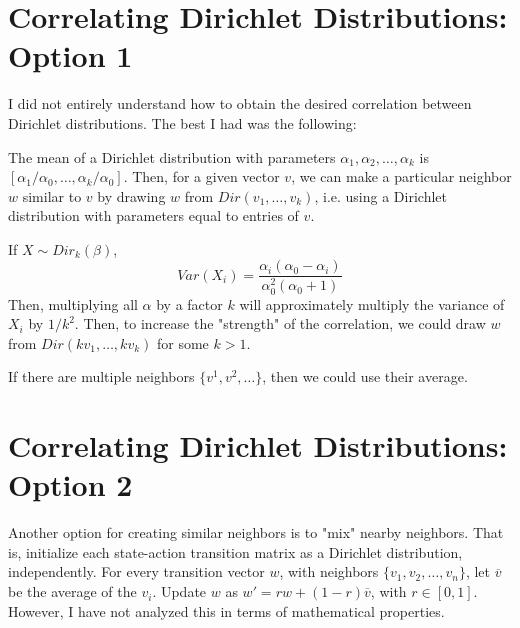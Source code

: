 \documentclass{article}
\begin{document}
\section{Correlating Dirichlet Distributions: Option 1}
I did not entirely understand how to obtain the desired correlation between Dirichlet distributions. The best I had was the following:

The mean of a Dirichlet distribution with parameters $\alpha_1, \alpha_2,\ldots,\alpha_k$ is $[\alpha_1/\alpha_0, \ldots,\alpha_k/\alpha_0]$. Then, for a given vector $v$, we can make a particular neighbor $w$ similar to $v$ by drawing $w$ from $Dir(v_1, \ldots, v_k)$, i.e. using a Dirichlet distribution with parameters equal to entries of $v$.

If $X\sim Dir_k(\beta)$,
$$Var(X_i) = \frac{\alpha_i(\alpha_0 - \alpha_i)}{\alpha_0^2(\alpha_0 + 1)}$$
Then, multiplying all $\alpha$ by a factor $k$ will approximately multiply the variance of $X_i$ by $1/k^2$. Then, to increase the "strength" of the correlation, we could draw $w$ from $Dir(kv_1, \ldots, kv_k)$ for some $k > 1$.

If there are multiple neighbors $\{v^1, v^2, \ldots\}$, then we could use their average.

\section{Correlating Dirichlet Distributions: Option 2}
Another option for creating similar neighbors is to "mix" nearby neighbors. That is, initialize each state-action transition matrix as a Dirichlet distribution, independently. For every transition vector $w$, with neighbors $\{v_1, v_2, \ldots, v_n\}$, let $\overline{v}$ be the average of the $v_i$. Update $w$ as $w' = rw + (1-r)\overline{v}$, with $r\in[0, 1]$. However, I have not analyzed this in terms of mathematical properties.
\end{document}
